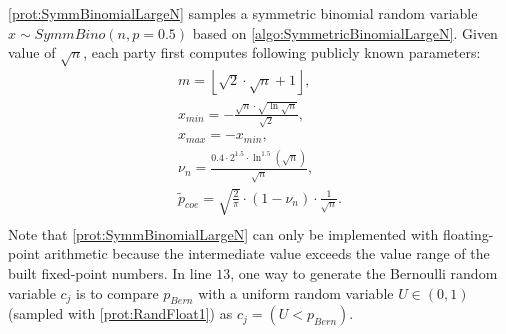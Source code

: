       \autoref{prot:SymmBinomialLargeN} samples a symmetric binomial random variable $x\sim SymmBino\left(n,p=0.5\right) $ based on \autoref{algo:SymmetricBinomialLargeN}.
      Given value of $\sqrt{n}$, each party first computes following publicly known parameters:
      \begin{equation}
            \begin{split}
                  m = \left\lfloor \sqrt{2}\cdot\sqrt{n}+1\right\rfloor ,\\
                  x_{min}=-\frac{\sqrt{n}\cdot \sqrt{\ln{\sqrt {n}}}}{\sqrt{2}},\\
                  x_{max}=-x_{min},\\
                  \nu_{n}=\frac{0.4\cdot2^{1.5}\cdot \ln ^{1.5}(\sqrt{n})}{\sqrt{n}},\\
                  \tilde{p}_{coe}=\sqrt{\frac{2}{\pi }} \cdot \left(1-\nu_{n}\right)\cdot \frac{1}{\sqrt{n}} .\\
            \end{split}
      \end{equation}
      Note that \autoref{prot:SymmBinomialLargeN} can only be implemented with floating-point arithmetic because the intermediate value exceeds the value range of the built fixed-point numbers.
      In line $13$, one way to generate the Bernoulli random variable $c_j $ is to compare $p_{Bern}$ with a uniform random variable $U\in \left(0,1\right) $ (sampled with \autoref{prot:RandFloat1}) as $c_j=\left(U<p_{Bern}\right) $.

